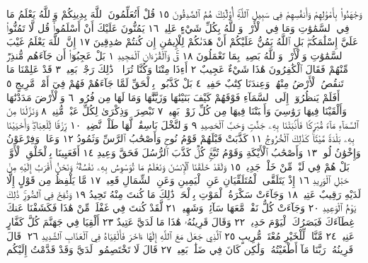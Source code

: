 وَجَٰهَدُوا۟ بِأَمْوَٰلِهِمْ وَأَنفُسِهِمْ فِي سَبِيلِ ٱللَّهِۚ أُو۟لَٰٓئِكَ هُمُ
ٱلصَّٰدِقُونَ ١٥ قُلْ أَتُعَلِّمُونَ ٱللَّهَ بِدِينِكُمْ وَٱللَّهُ يَعْلَمُ مَا فِي
ٱلسَّمَٰوَٰتِ وَمَا فِي ٱلْأَرْضِۚ وَٱللَّهُ بِكُلِّ شَيْءٍ عَلِيمࣱ ١٦ يَمُنُّونَ
عَلَيْكَ أَنْ أَسْلَمُوا۟ۖ قُل لَّا تَمُنُّوا۟ عَلَيَّ إِسْلَٰمَكُمۖ بَلِ ٱللَّهُ يَمُنُّ
عَلَيْكُمْ أَنْ هَدَىٰكُمْ لِلْإِيمَٰنِ إِن كُنتُمْ صَٰدِقِينَ ١٧ إِنَّ ٱللَّهَ يَعْلَمُ
غَيْبَ ٱلسَّمَٰوَٰتِ وَٱلْأَرْضِۚ وَٱللَّهُ بَصِيرُۢ بِمَا تَعْمَلُونَ ١٨
قٓۚ وَٱلْقُرْءَانِ ٱلْمَجِيدِ ١ بَلْ عَجِبُوٓا۟ أَن جَآءَهُم مُّنذِرࣱ مِّنْهُمْ
فَقَالَ ٱلْكَٰفِرُونَ هَٰذَا شَيْءٌ عَجِيبٌ ٢ أَءِذَا مِتْنَا وَكُنَّا تُرَابࣰاۖ ذَٰلِكَ
رَجْعُۢ بَعِيدࣱ ٣ قَدْ عَلِمْنَا مَا تَنقُصُ ٱلْأَرْضُ مِنْهُمْۖ وَعِندَنَا كِتَٰبٌ
حَفِيظُۢ ٤ بَلْ كَذَّبُوا۟ بِٱلْحَقِّ لَمَّا جَآءَهُمْ فَهُمْ فِيٓ أَمْرࣲ مَّرِيجٍ ٥
أَفَلَمْ يَنظُرُوٓا۟ إِلَى ٱلسَّمَآءِ فَوْقَهُمْ كَيْفَ بَنَيْنَٰهَا وَزَيَّنَّٰهَا
وَمَا لَهَا مِن فُرُوجࣲ ٦ وَٱلْأَرْضَ مَدَدْنَٰهَا وَأَلْقَيْنَا فِيهَا رَوَٰسِيَ
وَأَنۢبَتْنَا فِيهَا مِن كُلِّ زَوْجِۭ بَهِيجࣲ ٧ تَبْصِرَةࣰ وَذِكْرَىٰ لِكُلِّ عَبْدࣲ
مُّنِيبࣲ ٨ وَنَزَّلْنَا مِنَ ٱلسَّمَآءِ مَآءࣰ مُّبَٰرَكࣰا فَأَنۢبَتْنَا بِهِۦ جَنَّٰتࣲ
وَحَبَّ ٱلْحَصِيدِ ٩ وَٱلنَّخْلَ بَاسِقَٰتࣲ لَّهَا طَلْعࣱ نَّضِيدࣱ ١٠ رِّزْقࣰا
لِّلْعِبَادِۖ وَأَحْيَيْنَا بِهِۦ بَلْدَةࣰ مَّيْتࣰاۚ كَذَٰلِكَ ٱلْخُرُوجُ ١١ كَذَّبَتْ قَبْلَهُمْ
قَوْمُ نُوحࣲ وَأَصْحَٰبُ ٱلرَّسِّ وَثَمُودُ ١٢ وَعَادࣱ وَفِرْعَوْنُ وَإِخْوَٰنُ لُوطࣲ ١٣
وَأَصْحَٰبُ ٱلْأَيْكَةِ وَقَوْمُ تُبَّعࣲۚ كُلࣱّ كَذَّبَ ٱلرُّسُلَ فَحَقَّ وَعِيدِ ١٤
أَفَعَيِينَا بِٱلْخَلْقِ ٱلْأَوَّلِۚ بَلْ هُمْ فِي لَبْسࣲ مِّنْ خَلْقࣲ جَدِيدࣲ ١٥
وَلَقَدْ خَلَقْنَا ٱلْإِنسَٰنَ وَنَعْلَمُ مَا تُوَسْوِسُ بِهِۦ نَفْسُهُۥۖ وَنَحْنُ أَقْرَبُ إِلَيْهِ
مِنْ حَبْلِ ٱلْوَرِيدِ ١٦ إِذْ يَتَلَقَّى ٱلْمُتَلَقِّيَانِ عَنِ ٱلْيَمِينِ وَعَنِ ٱلشِّمَالِ
قَعِيدࣱ ١٧ مَّا يَلْفِظُ مِن قَوْلٍ إِلَّا لَدَيْهِ رَقِيبٌ عَتِيدࣱ ١٨ وَجَآءَتْ سَكْرَةُ
ٱلْمَوْتِ بِٱلْحَقِّۖ ذَٰلِكَ مَا كُنتَ مِنْهُ تَحِيدُ ١٩ وَنُفِخَ فِي ٱلصُّورِۚ ذَٰلِكَ يَوْمُ
ٱلْوَعِيدِ ٢٠ وَجَآءَتْ كُلُّ نَفْسࣲ مَّعَهَا سَآئِقࣱ وَشَهِيدࣱ ٢١ لَّقَدْ كُنتَ
فِي غَفْلَةࣲ مِّنْ هَٰذَا فَكَشَفْنَا عَنكَ غِطَآءَكَ فَبَصَرُكَ ٱلْيَوْمَ حَدِيدࣱ ٢٢
وَقَالَ قَرِينُهُۥ هَٰذَا مَا لَدَيَّ عَتِيدٌ ٢٣ أَلْقِيَا فِي جَهَنَّمَ كُلَّ كَفَّارٍ عَنِيدࣲ ٢٤
مَّنَّاعࣲ لِّلْخَيْرِ مُعْتَدࣲ مُّرِيبٍ ٢٥ ٱلَّذِي جَعَلَ مَعَ ٱللَّهِ إِلَٰهًا ءَاخَرَ
فَأَلْقِيَاهُ فِي ٱلْعَذَابِ ٱلشَّدِيدِ ٢٦۞ قَالَ قَرِينُهُۥ رَبَّنَا مَآ أَطْغَيْتُهُۥ وَلَٰكِن
كَانَ فِي ضَلَٰلِۭ بَعِيدࣲ ٢٧ قَالَ لَا تَخْتَصِمُوا۟ لَدَيَّ وَقَدْ قَدَّمْتُ إِلَيْكُم
